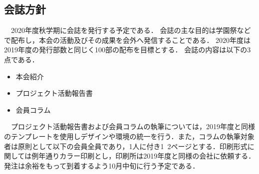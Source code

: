 \subsection*{会誌方針}
　2020年度秋学期に会誌を発行する予定である．
会誌の主な目的は学園祭などで配布し，本会の活動及びその成果を会外へ発信することである．
2020年度は2019年度の発行部数と同じく100部の配布を目標とする．
会誌の内容は以下の3点である．
\begin{itemize}
\item 本会紹介
\item プロジェクト活動報告書
\item 会員コラム
\end{itemize}
　プロジェクト活動報告書および会員コラムの執筆については，2019年度と同様のテンプレートを使用しデザインや環境の統一を行う．また，コラムの執筆対象者は原則として\thirdGrade{}以下の会員全員であり，1人に付き1~2ページとする．印刷形式に関しては例年通りカラー印刷とし，印刷所は2019年度と同様の会社に依頼する．発注は余裕をもって到着するよう10月中旬に行う予定である．

